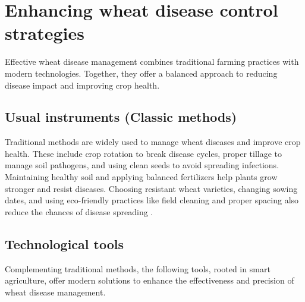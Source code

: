 \section{Enhancing wheat disease control strategies}

Effective wheat disease management combines traditional farming practices with modern technologies. Together, they offer a balanced approach to reducing disease impact and improving crop health.

\subsection*{Usual instruments (Classic methods)}
Traditional methods are widely used to manage wheat diseases and improve crop health. These include crop rotation to break disease cycles, proper tillage to manage soil pathogens, and using clean seeds to avoid spreading infections. Maintaining healthy soil and applying balanced fertilizers help plants grow stronger and resist diseases. Choosing resistant wheat varieties, changing sowing dates, and using eco-friendly practices like field cleaning and proper spacing also reduce the chances of disease spreading \parencite{mehta2014wheat}.

\subsection*{Technological tools}
Complementing traditional methods, the following tools, rooted in smart agriculture, offer modern solutions to enhance the effectiveness and precision of wheat disease management.


